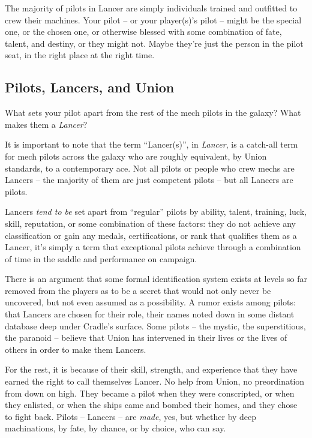 The majority of pilots in Lancer are simply individuals trained and outfitted to crew their
machines. Your pilot -- or your player(s)'s pilot -- might be the special one, or the chosen one, or
otherwise blessed with some combination of fate, talent, and destiny, or they might not. Maybe
they're just the person in the pilot seat, in the right place at the right time.

\subsection{Pilots, Lancers, and Union}

What sets your pilot apart from the rest of the mech pilots in the galaxy? What makes them a
\textit{Lancer}?

It is important to note that the term ``Lancer(s)'', in \textit{Lancer}, is a catch-all term for mech pilots
across the galaxy who are roughly equivalent, by Union standards, to a contemporary ace. Not all
pilots or people who crew mechs are Lancers -- the majority of them are just competent pilots --
but all Lancers are pilots.

Lancers \textit{tend to be} set apart from ``regular'' pilots by ability, talent, training, luck, skill, reputation, or
some combination of these factors: they do not achieve any classification or gain any medals,
certifications, or rank that qualifies them as a Lancer, it's simply a term that exceptional pilots
achieve through a combination of time in the saddle and performance on campaign.

There is an argument that some formal identification system exists at levels so far removed from
the players as to be a secret that would not only never be uncovered, but not even assumed as a
possibility. A rumor exists among pilots: that Lancers are chosen for their role, their names noted
down in some distant database deep under Cradle's surface. Some pilots -- the mystic, the
superstitious, the paranoid -- believe that Union has intervened in their lives or the lives of others
in order to make them Lancers.

For the rest, it is because of their skill, strength, and experience that they have earned the right to
call themselves Lancer. No help from Union, no preordination from down on high. They became a
pilot when they were conscripted, or when they enlisted, or when the ships came and bombed
their homes, and they chose to fight back. Pilots -- Lancers -- are \textit{made}, yes, but whether by deep
machinations, by fate, by chance, or by choice, who can say.

